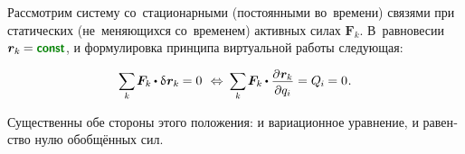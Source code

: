 

\label{para:statics}

\begin{otherlanguage}{russian}

Рассмотрим систему со~стационарными (постоянными во~времени) связями при статических (не~меняющихся со~временем) активных силах ${\bm{F}_k}$. В~равновесии ${\bm{r}_k \hspace{-0.12ex} = \boldconst}$, и формулировка принципа виртуальной работы следующая:

\nopagebreak\vspace{-0.1em}\begin{equation}\label{statics.discrete:principleofvirtualwork}
\scalebox{0.92}[0.96]{$ \displaystyle \sum_{\smash{k}} $} \hspace{.25ex}
\bm{F}_k \hspace{-0.1ex} \dotp \variation{\hspace{.1ex}\bm{r}_k} \hspace{-0.1ex} = 0
\:\,\Leftrightarrow\:
\scalebox{0.92}[0.96]{$ \displaystyle \sum_{\smash{k}} $} \hspace{.25ex}
\bm{F}_k \hspace{-0.1ex} \dotp \scalebox{0.96}{$ \displaystyle \frac{\raisemath{-0.12em}{\partial \hspace{.1ex} \bm{r}_k}}{\raisemath{-0.1em}{\partial q_i}} $}
= Q_{\hspace{-0.1ex}i} \hspace{-0.1ex} = 0 \hspace{.1ex} .
\vspace{-0.1em}\end{equation}

\vspace{-0.15em} \noindent Существенны обе стороны этого положения: и вариационное уравнение, и равенство нулю обобщённых сил.


\end{otherlanguage}
